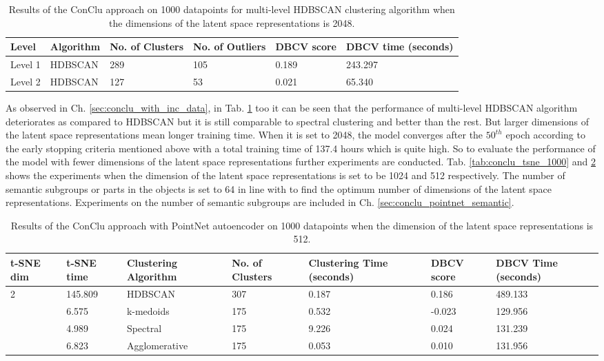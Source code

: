 \begin{table}[H]
  \setlength\extrarowheight{10pt}
  \caption{Results of the ConClu approach on 1000 datapoints for multi-level \ac{HDBSCAN} clustering algorithm when the dimensions of the latent space representations is 2048. }
  \centering
  \begin{tabular}{|l|l|l|l|l|l|}
    \toprule
    Level & Algorithm	& No. of Clusters	& No. of Outliers	& DBCV score	& \ac{DBCV} time (seconds)	\\  
    \midrule
    Level 1 & \ac{HDBSCAN}	& 289	& 105	& 0.189 & 243.297 \\ \cline{1-6}
    Level 2 & \ac{HDBSCAN}	& 127	& 53	& 0.021	& 65.340
    \\ 
    \bottomrule
  \end{tabular}
  \label{tab:conclu_2048_levels}
\end{table}

As observed in Ch. \ref{sec:conclu_with_inc_data}, in Tab. \ref{tab:conclu_2048_levels} too it can be seen that the performance of multi-level \ac{HDBSCAN} algorithm deteriorates as compared to \ac{HDBSCAN} but it is still comparable to spectral clustering and better than the rest. But larger dimensions of the latent space representations mean longer training time. When it is set to 2048, the model converges after the $50^{th}$ epoch according to the early stopping criteria mentioned above with a total training time of 137.4 hours which is quite high. So to evaluate the performance of the model with fewer dimensions of the latent space representations further experiments are conducted. Tab. \ref{tab:conclu_tsne_1000} and \ref{tab:conclu_512} shows the experiments when the dimension of the latent space representations is set to be 1024 and 512 respectively. The number of semantic subgroups or parts in the objects is set to 64 in line with \cite{mei2022unsupervised} to find the optimum number of dimensions of the latent space representations. Experiments on the number of semantic subgroups are included in Ch. \ref{sec:conclu_pointnet_semantic}. 

\begin{table}[H]
  \setlength\extrarowheight{10pt}
  \caption{Results of the ConClu approach with PointNet autoencoder on 1000 datapoints when the dimension of the latent space representations is 512. }
  \centering
  \begin{tabular}{|p{30pt}|p{50pt}|p{60pt}|p{50pt}|p{50pt}|p{50pt}|p{40pt}|}
    \toprule
    \ac{t-SNE} dim	& \ac{t-SNE} time & Clustering Algorithm & No. of Clusters & Clustering Time (seconds) & \ac{DBCV} score & \ac{DBCV} Time (seconds)\\
    \midrule
    \multirow{4}{30pt}{2}	& 145.809 & \ac{HDBSCAN}	& 307	& 0.187 & 0.186	& 489.133 \\ \cline{2-7} 
    & 6.575 & k-medoids	& 175	& 0.532 & -0.023	& 129.956 \\ \cline{2-7} 
    & 4.989 & Spectral	& 175	& 9.226 & 0.024 & 131.239 \\ \cline{2-7}
    & 6.823 & Agglomerative	& 175	& 0.053 & 0.010 & 131.956 \\ 
    \bottomrule
  \end{tabular}
  \label{tab:conclu_512}
\end{table}

